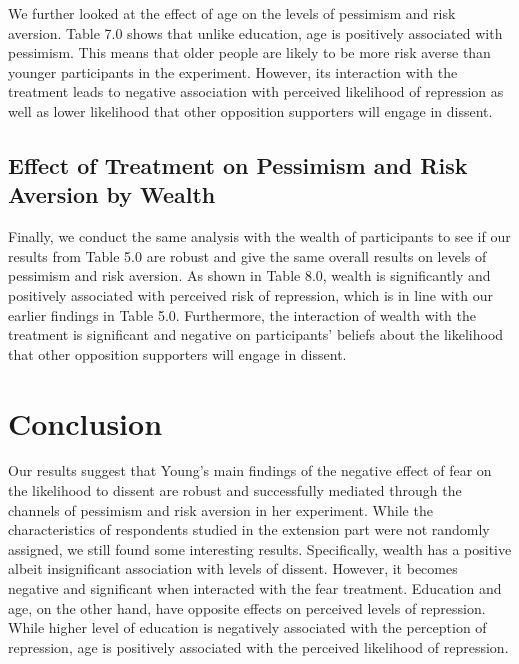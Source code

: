 \documentclass{article}
\begin{document}
We further looked at the effect of age on the levels of pessimism and risk aversion. Table 7.0 shows that unlike education, age is positively associated with pessimism. This means that older people are likely to be more risk averse than younger participants in the experiment. However, its interaction with the treatment leads to negative association with perceived likelihood of repression as well as lower likelihood that other opposition supporters will engage in dissent. 


\subsection{Effect of Treatment on Pessimism and Risk Aversion by Wealth}

Finally, we conduct the same analysis with the wealth of participants to see if our results from Table 5.0 are robust and give the same overall results on levels of pessimism and risk aversion. As shown in Table 8.0, wealth is significantly and positively associated with perceived risk of repression, which is in line with our earlier findings in Table 5.0. Furthermore, the interaction of wealth with the treatment is significant and negative on participants' beliefs about the likelihood that other opposition supporters will engage in dissent. 


\section{Conclusion}

Our results suggest that Young's main findings of the negative effect of fear on the likelihood to dissent are robust and successfully mediated through the channels of pessimism and risk aversion in her experiment. While the characteristics of respondents studied in the extension part were not randomly assigned, we still found some interesting results. Specifically, wealth has a positive albeit insignificant association with levels of dissent. However, it becomes negative and significant when interacted with the fear treatment. Education and age, on the other hand, have opposite effects on perceived levels of repression. While higher level of education is negatively associated with the perception of repression, age is positively associated with the perceived likelihood of repression.    
\end{document}
